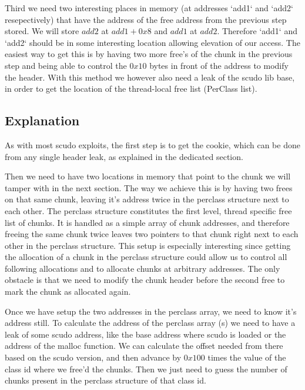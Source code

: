 \documentclass[a4paper,11pt,oneside]{report}
\begin{document}
Third we need two interesting places in memory (at addresses `add1` and `add2` resepectively) that have the address of the free address from the previous step stored. We will store $add2$ at $add1+0x8$ and $add1$ at $add2$. Therefore `add1` and `add2` should be in some interesting location allowing elevation of our access.  
The easiest way to get this is by having two more free's of the chunk in the previous step and being able to control the $0x10$ bytes in front of the address to modify the header. With this method we however also need a leak of the scudo lib base, in order to get the location of the thread-local free list (PerClass list).

\subsection{Explanation}

As with most scudo exploits, the first step is to get the cookie, which can be done from any single header leak, as explained in the dedicated section.

Then we need to have two locations in memory that point to the chunk we will tamper with in the next section. The way we achieve this is by having two frees on that same chunk, leaving it's address twice in the perclass structure next to each other. The perclass structure constitutes the first level, thread specific free list of chunks. It is handled as a simple array of chunk addresses, and therefore freeing the same chunk twice leaves two pointers to that chunk right next to each other in the perclass structure. This setup is especially interesting since getting the allocation of a chunk in the perclass structure could allow us to control all following allocations and to allocate chunks at arbitrary addresses. The only obstacle is that we need to modify the chunk header before the second free to mark the chunk as allocated again.

Once we have setup the two addresses in the perclass array, we need to know it's address still. To calculate the address of the perclass array (s) we need to have a leak of some scudo address, like the base address where scudo is loaded or the address of the malloc function. We can calculate the offset needed from there based on the scudo version, and then advance by $0x100$ times the value of the class id where we free'd the chunks. Then we just need to guess the number of chunks present in the perclass structure of that class id.
\end{document}
